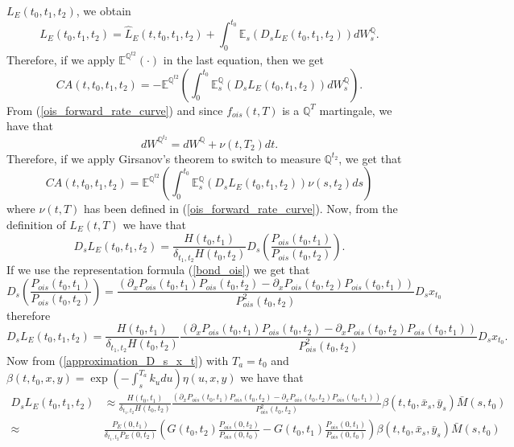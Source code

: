 \documentclass[a4paper,10pt]{article}
\newcommand{\1}{\mathbf{1}}
\begin{document}
$L_{E}(t_0,t_1,t_2)$, we obtain
\begin{equation}
L_{E}(t_0,t_1,t_2) = \hat{L}_{E}(t,t_0, t_1, t_2) + \int_{0}^{t_0} \mathbb{E}_{s}\left(D_s L_{E}(t_0,t_1,t_2) \right) dW^{\mathbb{Q}}_s.
\end{equation} 
Therefore, if we apply $\mathbb{E}^{\mathbb{Q}^{t2}}(\cdot)$ in the last equation, then we get
\begin{equation*}
CA(t, t_0, t_1, t_2) = - \mathbb{E}^{\mathbb{Q}^{t2}}\left(\int_{0}^{t_0} \mathbb{E}^{\mathbb{Q}}_{s}\left(D_s L_{E}(t_0,t_1,t_2) \right) dW^{\mathbb{Q}}_s \right).
\end{equation*}
From (\ref{ois_forward_rate_curve}) and since $f_{ois}(t,T)$ is a $\mathbb{Q}^{T}$ martingale, we have that
\begin{equation*}
dW^{\mathbb{Q}^{t_2}} = dW^{\mathbb{Q}} + \nu(t,T_2) dt. 
\end{equation*}
Therefore, if we apply Girsanov's theorem to switch to measure $\mathbb{Q}^{t_2}$, we get that
\begin{equation}\label{ca_general_future}
CA(t, t_0, t_1, t_2) = \mathbb{E}^{\mathbb{Q}^{t2}}\left(\int_{0}^{t_0} \mathbb{E}^{\mathbb{Q}}_{s}\left(D_s L_{E}(t_0,t_1,t_2) \right) \nu(s,t_2) ds \right)
\end{equation}
where $\nu(t,T)$ has been defined in (\ref{ois_forward_rate_curve}). Now, from the definition of $L_{E}(t,T)$ we have that
\begin{equation*}
D_s L_{E}(t_0,t_1,t_2) = \frac{H(t_0,t_1)}{\delta_{t_1,t_2}H(t_0,t_2)} D_s \left(\frac{P_{ois}(t_0,t_1)}{P_{ois}(t_0,t_2)}\right). 
\end{equation*}
If we use the representation formula (\ref{bond_ois}) we get that
\begin{equation*}
D_s \left(\frac{P_{ois}(t_0,t_1)}{P_{ois}(t_0,t_2)}\right) = \frac{\left(\partial_{x}P_{ois}(t_0,t_1)P_{ois}(t_0,t_2) - \partial_{x}P_{ois}(t_0,t_2) P_{ois}(t_0,t_1) \right)}{P^{2}_{ois}(t_0,t_2)} D_s x_{t_0}
\end{equation*}
therefore
\begin{equation}\label{malliavin_derive_L}
D_s L_{E}(t_0,t_1,t_2) = \frac{H(t_0,t_1)}{\delta_{t_1,t_2}H(t_0,t_2)}\frac{\left(\partial_{x}P_{ois}(t_0,t_1)P_{ois}(t_0,t_2) - \partial_{x}P_{ois}(t_0,t_2) P_{ois}(t_0,t_1) \right)}{P^{2}_{ois}(t_0,t_2)} D_s x_{t_0}. 
\end{equation}
Now from (\ref{approximation_D_s_x_t}) with $T_a=t_0$ and $\beta(t,t_0,x,y) = \exp\left(-\int_{s}^{T_a}k_u du \right) \eta(u,x,y)$ we have that
\begin{align*}
D_s L_{E}(t_0,t_1,t_2) &\approx \frac{H(t_0,t_1)}{\delta_{t_1,t_2}H(t_0,t_2)}\frac{\left(\partial_{x}P_{ois}(t_0,t_1)P_{ois}(t_0,t_2) - \partial_{x}P_{ois}(t_0,t_2) P_{ois}(t_0,t_1) \right)}{P^{2}_{ois}(t_0,t_2)} \beta(t,t_0,\bar{x}_s,\bar{y}_s)\bar{M}(s,t_0) \nonumber \\
\approx& \frac{P_{E}(0,t_1)}{\delta_{t_1,t_2} P_{E}(0,t_2)} \left(G(t_0,t_2) \frac{P_{ois}(0,t_2)}{P_{ois}(0,t_0)} - G(t_0,t_1) \frac{P_{ois}(0,t_1)}{P_{ois}(0,t_0)} \right)\beta(t,t_0,\bar{x}_s,\bar{y}_s)\bar{M}(s,t_0)
\end{align*}
\end{document}
